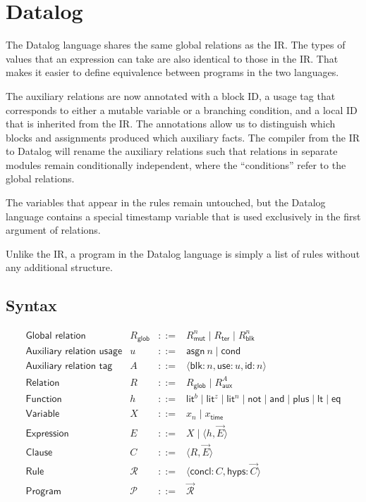 \documentclass[11pt]{article}
\newcommand{\mcp}{\mathcal{P}}
\newcommand{\mcr}{\mathcal{R}}
\newcommand{\mut}{\textsf{mut}}
\newcommand{\blk}{\textsf{blk}}
\newcommand{\ter}{\textsf{ter}}
\newcommand{\glob}{\textsf{glob}}
\newcommand{\aux}{\textsf{aux}}
\newcommand{\flit}{\textsf{lit}}
\newcommand{\fnot}{\textsf{not}}
\newcommand{\fand}{\textsf{and}}
\newcommand{\fplus}{\textsf{plus}}
\newcommand{\flt}{\textsf{lt}}
\newcommand{\feq}{\textsf{eq}}
\newcommand{\concl}{\textsf{concl}}
\newcommand{\hyps}{\textsf{hyps}}
\begin{document}
\section{Datalog}
The Datalog language shares the same global relations as the IR.
The types of values that an expression can take are also identical to those in the IR.
That makes it easier to define equivalence between programs in the two languages.

The auxiliary relations are now annotated with a block ID, a usage tag that corresponds to either a mutable variable or a branching condition, and a local ID that is inherited from the IR.
The annotations allow us to distinguish which blocks and assignments produced which auxiliary facts.
The compiler from the IR to Datalog will rename the auxiliary relations such that relations in separate modules remain conditionally independent, where the ``conditions'' refer to the global relations.

The variables that appear in the rules remain untouched, but the Datalog language contains a special timestamp variable that is used exclusively in the first argument of relations.

Unlike the IR, a program in the Datalog language is simply a list of rules without any additional structure.

\subsection{Syntax}
\[
\begin{array}{llcl}
\textsf{Global relation} & R_{\glob{}} & ::= & R_{\mut{}}^n
\mid R_{\ter{}}
\mid R_{\blk{}}^n
\\

\textsf{Auxiliary relation usage} & u & ::= & \textsf{asgn}~n
\mid \textsf{cond}
\\

\textsf{Auxiliary relation tag} & A & ::= & \langle \blk: n, \textsf{use}: u, \textsf{id}: n \rangle
\\

\textsf{Relation} & R & ::= & R_{\glob{}}
\mid R_{\aux{}}^A
\\

\textsf{Function} & h & ::= & \flit{}^b
\mid \flit{}^z
\mid \flit{}^n
\mid \fnot
\mid \fand
\mid \fplus
\mid \flt
\mid \feq
\\

\textsf{Variable} & X & ::= & x_n
\mid x_{\textsf{time}}
\\

\textsf{Expression} & E & ::= & X
\mid \langle h, \vec{E} \rangle
\\

\textsf{Clause} & C & ::= & \langle R, \vec{E} \rangle
\\

\textsf{Rule} & \mcr{} & ::= & \langle \concl{}: C, \hyps{}: \vec{C} \rangle
\\

\textsf{Program} & \mcp{} & ::= & \vec{\mcr{}}
\\

\end{array}
\]
\end{document}
